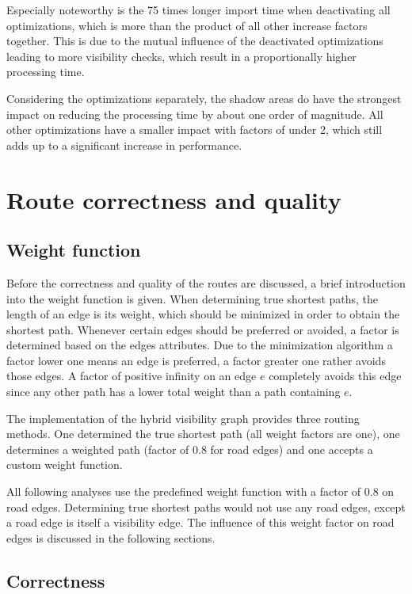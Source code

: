 		Especially noteworthy is the 75 times longer import time when deactivating all optimizations, which is more than the product of all other increase factors together.
		This is due to the mutual influence of the deactivated optimizations leading to more visibility checks, which result in a proportionally higher processing time.
		
		Considering the optimizations separately, the shadow areas do have the strongest impact on reducing the processing time by about one order of magnitude.
		All other optimizations have a smaller impact with factors of under 2, which still adds up to a significant increase in performance.
		
\section{Route correctness and quality}

	\subsection{Weight function}
	
		Before the correctness and quality of the routes are discussed, a brief introduction into the weight function is given.
		When determining true shortest paths, the length of an edge is its weight, which should be minimized in order to obtain the shortest path.
		Whenever certain edges should be preferred or avoided, a factor is determined based on the edges attributes.
		Due to the minimization algorithm a factor lower one means an edge is preferred, a factor greater one rather avoids those edges.
		A factor of positive infinity on an edge $e$ completely avoids this edge since any other path has a lower total weight than a path containing $e$.
		
		The implementation of the hybrid visibility graph provides three routing methods.
		One determined the true shortest path (all weight factors are one), one determines a weighted path (factor of 0.8 for road edges) and one accepts a custom weight function.
		
		All following analyses use the predefined weight function with a factor of 0.8 on road edges.
		Determining true shortest paths would not use any road edges, except a road edge is itself a visibility edge.
		The influence of this weight factor on road edges is discussed in the following sections.

	\subsection{Correctness}
	\label{subsec:correctness}
	

